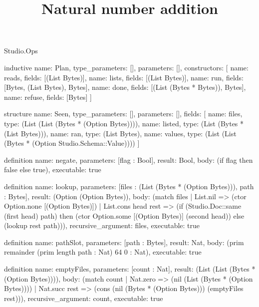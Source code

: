 \begin{lexlean}{Studio.Ops}
\title{Natural number addition}
\begin{semanticmodule}
inductive{
  name: Plan,
  type_parameters: [],
  parameters: [],
  constructors: [
    {name: reads, fields: [(List Bytes)]},
    {name: lists, fields: [(List Bytes)]},
    {name: run, fields: [Bytes, (List Bytes), Bytes]},
    {name: done, fields: [(List (Bytes * Bytes)), Bytes]},
    {name: refuse, fields: [Bytes]}
  ]
}


structure{
  name: Seen,
  type_parameters: [],
  parameters: [],
  fields: [
    {name: files, type: (List (List (Bytes * (Option Bytes))))},
    {name: listed, type: (List (Bytes * (List Bytes)))},
    {name: ran, type: (List Bytes)},
    {name: values, type: (List (List (Bytes * (Option Studio.Schema::Value))))}
  ]
}


definition{
  name: negate,
  parameters: [flag : Bool],
  result: Bool,
  body: (if flag then false else true),
  executable: true
}

definition{
  name: lookup,
  parameters: [files : (List (Bytes * (Option Bytes))), path : Bytes],
  result: (Option (Option Bytes)),
  body: (match files
    | List.nil => (ctor Option.none [(Option Bytes)])
    | List.cons head rest => (if (Studio.Doc::same (first head) path) then (ctor Option.some [(Option Bytes)] (second head)) else (lookup rest path))),
  recursive_argument: files,
  executable: true
}


definition{
  name: pathSlot,
  parameters: [path : Bytes],
  result: Nat,
  body: (prim remainder (prim length path : Nat) 64 0 : Nat),
  executable: true
}

definition{
  name: emptyFiles,
  parameters: [count : Nat],
  result: (List (List (Bytes * (Option Bytes)))),
  body: (match count
    | Nat.zero => (nil (List (Bytes * (Option Bytes))))
    | Nat.succ rest => (cons (nil (Bytes * (Option Bytes))) (emptyFiles rest))),
  recursive_argument: count,
  executable: true
}


\end{semanticmodule}
\end{lexlean}
